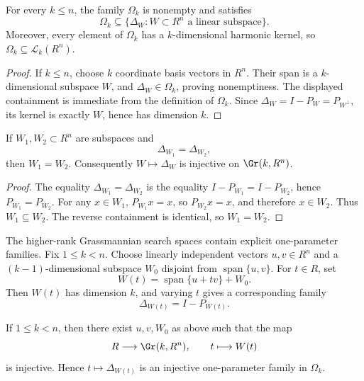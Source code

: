 \begin{proposition}\label{prop:grassmannian-search-space}
  For every \(k\le n\), the family \(\Omega_k\) is nonempty and satisfies
  \[
    \Omega_k
    \subseteq
    \{\Delta_W:W\subset R^n\text{ a linear subspace}\}.
  \]
  Moreover, every element of \(\Omega_k\) has a \(k\)-dimensional harmonic
  kernel, so \(\Omega_k\subseteq\mathcal L_k(R^n)\).
\end{proposition}

\begin{proof}
  If \(k\le n\), choose \(k\) coordinate basis vectors in \(R^n\). Their span
  is a \(k\)-dimensional subspace \(W\), and \(\Delta_W\in\Omega_k\), proving
  nonemptiness. The displayed containment is immediate from the definition of
  \(\Omega_k\). Since \(\Delta_W=I-P_W=P_{W^\perp}\), its kernel is exactly
  \(W\), hence has dimension \(k\).
\end{proof}

\begin{proposition}\label{prop:grassmannian-laplacian-injective}
  If \(W_1,W_2\subset R^n\) are subspaces and
  \[
    \Delta_{W_1}=\Delta_{W_2},
  \]
  then \(W_1=W_2\). Consequently \(W\mapsto\Delta_W\) is injective on
  \(\Gr(k,R^n)\).
\end{proposition}

\begin{proof}
  The equality \(\Delta_{W_1}=\Delta_{W_2}\) is the equality
  \(I-P_{W_1}=I-P_{W_2}\), hence \(P_{W_1}=P_{W_2}\). For any
  \(x\in W_1\), \(P_{W_1}x=x\), so \(P_{W_2}x=x\), and therefore
  \(x\in W_2\). Thus \(W_1\subseteq W_2\). The reverse containment is
  identical, so \(W_1=W_2\).
\end{proof}

The higher-rank Grassmannian search spaces contain explicit one-parameter
families. Fix \(1\le k<n\). Choose linearly independent vectors \(u,v\in R^n\)
and a \((k-1)\)-dimensional subspace \(W_0\) disjoint from
\(\operatorname{span}\{u,v\}\). For \(t\in R\), set
\[
  W(t)=\operatorname{span}\{u+t v\}+W_0.
\]
Then \(W(t)\) has dimension \(k\), and varying \(t\) gives a corresponding
family
\[
  \Delta_{W(t)}=I-P_{W(t)}.
\]

\begin{proposition}\label{prop:parametric-laplacian-search-space}
  If \(1\le k<n\), then there exist \(u,v,W_0\) as above such that the map
  \[
    R\longrightarrow\Gr(k,R^n),
    \qquad
    t\longmapsto W(t)
  \]
  is injective. Hence \(t\mapsto\Delta_{W(t)}\) is an injective
  one-parameter family in \(\Omega_k\).
\end{proposition}

